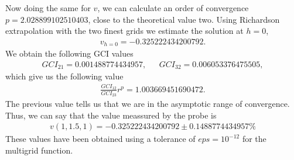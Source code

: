 Now doing the same for $v$, we can calculate an order of convergence $p=2.028899102510403$, close to the theoretical value two. Using Richardson extrapolation with the two finest grids we estimate the solution at $h=0$,
\begin{align*}
v_{h=0}=-0.325222434200792.
\end{align*}
We obtain the following GCI values
\begin{align*}
GCI_{21}=0.001488774434957,~~~~~~~GCI_{32}=0.006053376475505,
\end{align*}
which give us the following value
\begin{align*}
\frac{GCI_{12}}{GCI_{23}}r^p=1.003669451690472.
\end{align*}
The previous value tells us that we are in the asymptotic range of convergence. Thus, we can say that the value meassured by the probe is
\begin{align*}
v(1,1.5,1)=-0.325222434200792\pm 0.1488774434957\%
\end{align*}
These values have been obtained using a tolerance of $eps=10^{-12}$ for the multigrid function.